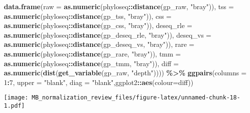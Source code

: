 \documentclass[
]{book}
\newenvironment{Shaded}{\begin{snugshade}}{\end{snugshade}}
\newcommand{\DataTypeTok}[1]{\textcolor[rgb]{0.13,0.29,0.53}{#1}}
\newcommand{\DecValTok}[1]{\textcolor[rgb]{0.00,0.00,0.81}{#1}}
\newcommand{\KeywordTok}[1]{\textcolor[rgb]{0.13,0.29,0.53}{\textbf{#1}}}
\newcommand{\NormalTok}[1]{#1}
\newcommand{\OperatorTok}[1]{\textcolor[rgb]{0.81,0.36,0.00}{\textbf{#1}}}
\newcommand{\StringTok}[1]{\textcolor[rgb]{0.31,0.60,0.02}{#1}}
\begin{document}
\begin{Shaded}
\begin{Highlighting}[]
\KeywordTok{data.frame}\NormalTok{(}\DataTypeTok{raw =} \KeywordTok{as.numeric}\NormalTok{(phyloseq}\OperatorTok{::}\KeywordTok{distance}\NormalTok{(gp\_raw, }\StringTok{"bray"}\NormalTok{)), }
           \DataTypeTok{tss =} \KeywordTok{as.numeric}\NormalTok{(phyloseq}\OperatorTok{::}\KeywordTok{distance}\NormalTok{(gp\_tss, }\StringTok{"bray"}\NormalTok{)), }
           \DataTypeTok{css =} \KeywordTok{as.numeric}\NormalTok{(phyloseq}\OperatorTok{::}\KeywordTok{distance}\NormalTok{(gp\_css, }\StringTok{"bray"}\NormalTok{)),}
           \DataTypeTok{deseq\_rle =} \KeywordTok{as.numeric}\NormalTok{(phyloseq}\OperatorTok{::}\KeywordTok{distance}\NormalTok{(gp\_deseq\_rle, }\StringTok{"bray"}\NormalTok{)),}
           \DataTypeTok{deseq\_vs =} \KeywordTok{as.numeric}\NormalTok{(phyloseq}\OperatorTok{::}\KeywordTok{distance}\NormalTok{(gp\_deseq\_vs, }\StringTok{"bray"}\NormalTok{)),}
           \DataTypeTok{rare =} \KeywordTok{as.numeric}\NormalTok{(phyloseq}\OperatorTok{::}\KeywordTok{distance}\NormalTok{(gp\_rare, }\StringTok{"bray"}\NormalTok{)),}
           \DataTypeTok{tmm =} \KeywordTok{as.numeric}\NormalTok{(phyloseq}\OperatorTok{::}\KeywordTok{distance}\NormalTok{(gp\_tmm, }\StringTok{"bray"}\NormalTok{)),}
           \DataTypeTok{diff =} \KeywordTok{as.numeric}\NormalTok{(}\KeywordTok{dist}\NormalTok{(}\KeywordTok{get\_variable}\NormalTok{(gp\_raw, }\StringTok{"depth"}\NormalTok{)))) }\OperatorTok{\%\textgreater{}\%}\StringTok{ }
\StringTok{    }\KeywordTok{ggpairs}\NormalTok{(}\DataTypeTok{columns =} \DecValTok{1}\OperatorTok{:}\DecValTok{7}\NormalTok{, }\DataTypeTok{upper =} \StringTok{"blank"}\NormalTok{,}
            \DataTypeTok{diag =} \StringTok{"blank"}\NormalTok{,ggplot2}\OperatorTok{::}\KeywordTok{aes}\NormalTok{(}\DataTypeTok{colour=}\NormalTok{diff))}
\end{Highlighting}
\end{Shaded}

\texttt{[image: MB\_normalization\_review\_files/figure-latex/unnamed-chunk-18-1.pdf]}

  
\end{document}
